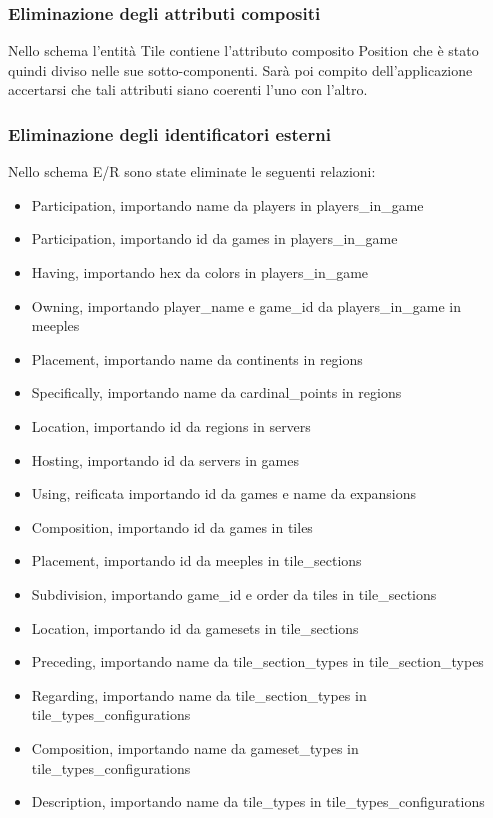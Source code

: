 \subsubsection*{Eliminazione degli attributi compositi}
Nello schema l'entità Tile contiene l'attributo composito Position che è stato quindi diviso nelle sue sotto-componenti. Sarà poi compito dell'applicazione accertarsi che tali attributi siano coerenti l'uno con l'altro.
\medskip

\subsubsection*{Eliminazione degli identificatori esterni}
Nello schema E/R sono state eliminate le seguenti relazioni:
\begin{itemize}
    \item Participation, importando name da players in players\_in\_game
    \item Participation, importando id da games in players\_in\_game
    \item Having, importando hex da colors in players\_in\_game
    \item Owning, importando player\_name e game\_id da players\_in\_game in meeples
    \item Placement, importando name da continents in regions
    \item Specifically, importando name da cardinal\_points in regions
    \item Location, importando id da regions in servers
    \item Hosting, importando id da servers in games
    \item Using, reificata importando id da games e name da expansions
    \item Composition, importando id da games in tiles
    \item Placement, importando id da meeples in tile\_sections
    \item Subdivision, importando game\_id e order da tiles in tile\_sections
    \item Location, importando id da gamesets in tile\_sections
    \item Preceding, importando name da tile\_section\_types in tile\_section\_types
    \item Regarding, importando name da tile\_section\_types in tile\_types\_configurations
    \item Composition, importando name da gameset\_types in tile\_types\_configurations
    \item Description, importando name da tile\_types in tile\_types\_configurations

\end{itemize}
